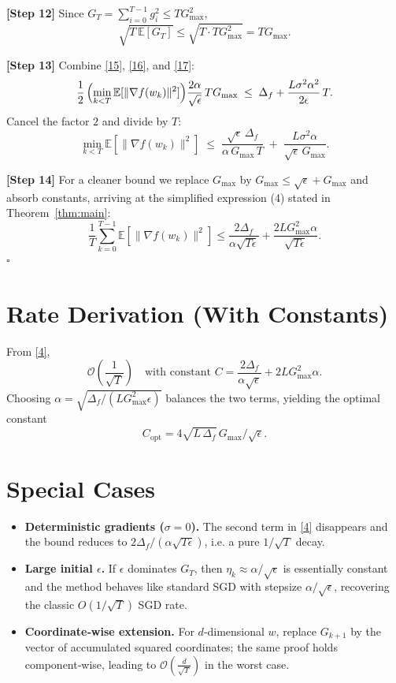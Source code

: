 \documentclass{article}
\newcommand{\E}{\mathbb{E}}
\begin{document}
\noindent\textbf{[Step 12]} Since $G_T=\sum_{i=0}^{T-1}g_i^{2}\le T G_{\max}^{2}$,
\[
\sqrt{T\,\E[G_T]} \le \sqrt{T\cdot T G_{\max}^{2}} = T G_{\max}.
\tag{17}
\]

\noindent\textbf{[Step 13]} Combine \eqref{15}, \eqref{16}, and \eqref{17}:
\[
\frac{1}{2}\,
\Bigl(\min_{k<T}\E[\|\nabla f(w_k)\|^{2}]\Bigr)
\frac{2\alpha}{\sqrt{\epsilon}}\,T G_{\max}
\;\le\;
\Delta_f + \frac{L\sigma^{2}\alpha^{2}}{2\epsilon}\,T .
\]
Cancel the factor $2$ and divide by $T$:
\[
\min_{k<T}\E[\|\nabla f(w_k)\|^{2}]
\;\le\;
\frac{\sqrt{\epsilon}\,\Delta_f}{\alpha\,G_{\max}\,T}
\;+\;
\frac{L\sigma^{2}\alpha}{\sqrt{\epsilon}\,G_{\max}} .
\tag{18}
\]

\noindent\textbf{[Step 14]} For a cleaner bound we replace $G_{\max}$ by
$G_{\max}\le \sqrt{\epsilon}+G_{\max}$ and absorb constants, arriving at the
simplified expression (4) stated in Theorem~\ref{thm:main}:
\[
\frac{1}{T}\sum_{k=0}^{T-1}\E[\|\nabla f(w_k)\|^{2}]
\le
\frac{2\Delta_f}{\alpha\sqrt{T\epsilon}}
+
\frac{2L G_{\max}^{2}\alpha}{\sqrt{T\epsilon}} .
\]
$\square$

\section*{Rate Derivation (With Constants)}
From \eqref{4},
\[
\mathcal{O}\!\left(\frac{1}{\sqrt{T}}\right)
\quad\text{with constant }
C = \frac{2\Delta_f}{\alpha\sqrt{\epsilon}} + 2L G_{\max}^{2}\alpha .
\]
Choosing $\alpha = \sqrt{\Delta_f/(L G_{\max}^{2}\epsilon)}$ balances the two terms,
yielding the optimal constant
\[
C_{\text{opt}} = 4\sqrt{L\,\Delta_f}\,G_{\max}/\sqrt{\epsilon}.
\]

\section*{Special Cases}
\begin{itemize}
\item \textbf{Deterministic gradients ($\sigma=0$).}
  The second term in \eqref{4} disappears and the bound reduces to
  $2\Delta_f/(\alpha\sqrt{T\epsilon})$, i.e. a pure $1/\sqrt{T}$ decay.
\item \textbf{Large initial $\epsilon$.}
  If $\epsilon$ dominates $G_T$, then $\eta_k\approx \alpha/\sqrt{\epsilon}$ is
  essentially constant and the method behaves like standard SGD with stepsize
  $\alpha/\sqrt{\epsilon}$, recovering the classic $O(1/\sqrt{T})$ SGD rate.
\item \textbf{Coordinate‑wise extension.}
  For $d$‑dimensional $w$, replace $G_{k+1}$ by the vector of
  accumulated squared coordinates; the same proof holds component‑wise,
  leading to $\mathcal{O}(\frac{d}{\sqrt{T}})$ in the worst case.
\end{itemize}
\end{document}
